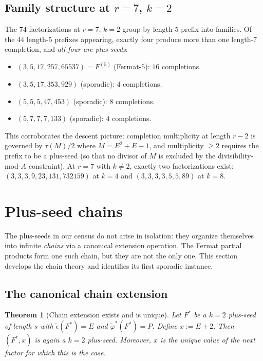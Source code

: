 \documentclass[11pt]{article}
\newtheorem{theorem}{Theorem}
\theoremstyle{definition}
\theoremstyle{remark}
\newcommand{\eps}{\tilde{\epsilon}}
\newcommand{\phist}{\tilde{\varphi}^*}
\begin{document}
\subsection{Family structure at $r = 7$, $k = 2$}\label{subsec:families}

The $74$ factorizations at $r = 7$, $k = 2$ group by length-$5$ prefix
into families.  Of the $44$ length-$5$ prefixes appearing, exactly
four produce more than one length-$7$ completion, and \emph{all four
are plus-seeds}:
\begin{itemize}
  \item $(3, 5, 17, 257, 65537) = F^{(5)}$ (Fermat-$5$): $16$ completions.
  \item $(3, 5, 17, 353, 929)$ (sporadic): $4$ completions.
  \item $(5, 5, 5, 47, 453)$ (sporadic): $8$ completions.
  \item $(5, 7, 7, 7, 133)$ (sporadic): $4$ completions.
\end{itemize}
This corroborates the descent picture: completion multiplicity at
length $r - 2$ is governed by $\tau(M) / 2$ where
$M = E^2 + E - 1$, and multiplicity $\ge 2$ requires the prefix to be
a plus-seed (so that no divisor of $M$ is excluded by the
divisibility-mod-$A$ constraint).  At $r = 7$ with $k \ne 2$, exactly
two factorizations exist:
$(3, 3, 3, 9, 23, 131, 732159)$ at $k = 4$ and
$(3, 3, 3, 3, 5, 5, 89)$ at $k = 8$.


\section{Plus-seed chains}\label{sec:plus-seed-chains}

The plus-seeds in our census do not arise in isolation: they organize
themselves into infinite \emph{chains} via a canonical extension
operation.  The Fermat partial products form one such chain, but they
are not the only one.  This section develops the chain theory and
identifies its first sporadic instance.

\subsection{The canonical chain extension}

\begin{theorem}[Chain extension exists and is unique]\label{thm:chain-existence}
Let $F^*$ be a $k = 2$ plus-seed of length $s$ with $\eps(F^*) = E$
and $\phist(F^*) = P$.  Define $x := E + 2$.  Then $(F^*, x)$ is again
a $k = 2$ plus-seed.  Moreover, $x$ is the unique value of the next
factor for which this is the case.
\end{theorem}
\end{document}
